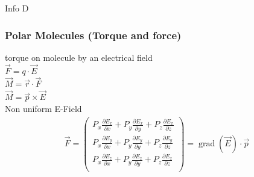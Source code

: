 \documentclass[a4paper, 10pt]{scrartcl}
\begin{document}
Info D\\

\subsubsection{Polar Molecules (Torque and force)}

torque on molecule by an electrical field\\

$ \vec{F}=q\cdot\vec{E}$\\

$ \vec{M}=\vec{r}\cdot\vec{F}$\\

$ \vec{M}=\vec{p}\times\vec{E}$\\

Non uniform E-Field\\

\begin{align}
	\vec F = \begin{pmatrix}
		P_x \frac{\partial E_x}{\partial x} + P_y \frac{\partial E_x}{\partial y} + P_z
		\frac{\partial E_x}{\partial z}\\
		P_x \frac{\partial E_y}{\partial x} + P_y \frac{\partial E_y}{\partial y} + P_z
		\frac{\partial E_y}{\partial z}\\
		P_x \frac{\partial E_z}{\partial x} + P_y \frac{\partial E_z}{\partial y} + P_z
		\frac{\partial E_z}{\partial z}\\
	\end{pmatrix}
	= \operatorname{grad} (\vec E) \cdot \vec p
\end{align}
\end{document}

